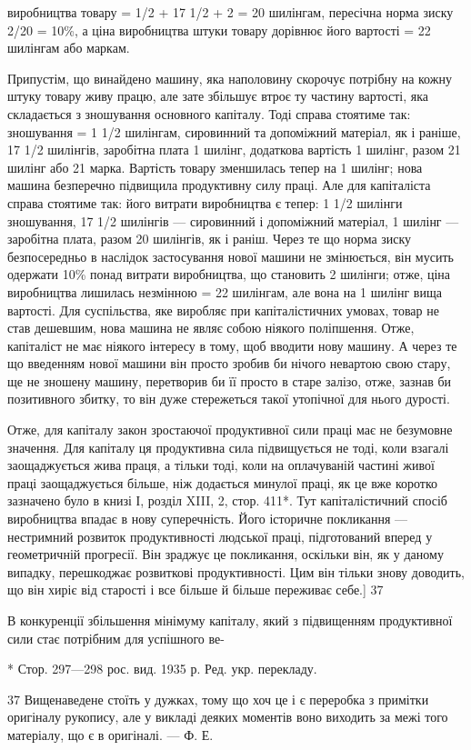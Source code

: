 виробництва товару = 1/2 + 17 1/2 + 2 = 20 шилінгам, пересічна
норма зиску 2/20 = 10\%, а ціна виробництва штуки товару дорівнює
його вартості = 22 шилінгам або маркам.

Припустім, що винайдено машину, яка наполовину скорочує
потрібну на кожну штуку товару живу працю, але зате
збільшує втроє ту частину вартості, яка складається з зношування
основного капіталу. Тоді справа стоятиме так: зношування
= 1 1/2 шилінгам, сировинний та допоміжний матеріал, як
і раніше, 17 1/2 шилінгів, заробітна плата 1 шилінг, додаткова
вартість 1 шилінг, разом 21 шилінг або 21 марка. Вартість товару
зменшилась тепер на 1 шилінг; нова машина безперечно підвищила
продуктивну силу праці. Але для капіталіста справа стоятиме
так: його витрати виробництва є тепер: 1 1/2 шилінги зношування,
17 1/2 шилінгів — сировинний і допоміжний матеріал,
1 шилінг — заробітна плата, разом 20 шилінгів, як і раніш.
Через те що норма зиску безпосередньо в наслідок застосування
нової машини не змінюється, він мусить одержати 10\%
понад витрати виробництва, що становить 2 шилінги; отже, ціна
виробництва лишилась незмінною = 22 шилінгам, але вона на 1 шилінг
вища вартості. Для суспільства, яке виробляє при капіталістичних
умовах, товар не став дешевшим, нова машина не являє
собою ніякого поліпшення. Отже, капіталіст не має ніякого
інтересу в тому, щоб вводити нову машину. А через те що
введенням нової машини він просто зробив би нічого невартою
свою стару, ще не зношену машину, перетворив би її просто
в старе залізо, отже, зазнав би позитивного збитку, то він дуже
стережеться такої утопічної для нього дурості.

Отже, для капіталу закон зростаючої продуктивної сили праці
має не безумовне значення. Для капіталу ця продуктивна сила
підвищується не тоді, коли взагалі заощаджується жива праця,
а тільки тоді, коли на оплачуваній частині живої праці заощаджується
більше, ніж додається минулої праці, як це вже коротко
зазначено було в книзі І, розділ XIII, 2, стор. 411*. Тут
капіталістичний спосіб виробництва впадає в нову суперечність.
Його історичне покликання — нестримний розвиток продуктивності
людської праці, підготований вперед у геометричній прогресії.
Він зраджує це покликання, оскільки він, як у даному
випадку, перешкоджає розвиткові продуктивності. Цим він тільки
знову доводить, що він хиріє від старості і все більше й більше
переживає себе.] 37

В конкуренції збільшення мінімуму капіталу, який з підвищенням
продуктивної сили стає потрібним для успішного ве-

* Стор. 297—298 рос. вид. 1935 р. Ред. укр. перекладу.

37 Вищенаведене стоїть у дужках, тому що хоч це і є переробка з примітки
оригіналу рукопису, але у викладі деяких моментів воно виходить за
межі того матеріалу, що є в оригіналі. — Ф. Е.
